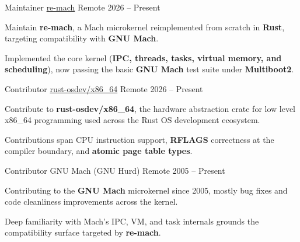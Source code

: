 
\begin{cventries}


	\cventry
	{Maintainer}
	{\href{https://github.com/llp42/re-mach}{re-mach}}
	{Remote}
	{2026 -- Present}
	{
		\begin{cvitems}
			\item Maintain \textbf{re-mach}, a Mach microkernel reimplemented from scratch in \textbf{Rust}, targeting compatibility with \textbf{GNU Mach}.
			\item Implemented the core kernel (\textbf{IPC, threads, tasks, virtual memory, and scheduling}), now passing the basic \textbf{GNU Mach} test suite under \textbf{Multiboot2}.
		\end{cvitems}
	}

	\cventry
	{Contributor}
	{\href{https://github.com/rust-osdev/x86_64}{rust-osdev/x86\_64}}
	{Remote}
	{2026 -- Present}
	{
		\begin{cvitems}
			\item Contribute to \textbf{rust-osdev/x86\_64}, the hardware abstraction crate for low level x86\_64 programming used across the Rust OS development ecosystem.
			\item Contributions span CPU instruction support, \textbf{RFLAGS} correctness at the compiler boundary, and \textbf{atomic page table types}.
		\end{cvitems}
	}

	\cventry
	{Contributor}
	{GNU Mach (GNU Hurd)}
	{Remote}
	{2005 -- Present}
	{
		\begin{cvitems}
			\item Contributing to the \textbf{GNU Mach} microkernel since 2005, mostly bug fixes and code cleanliness improvements across the kernel.
			\item Deep familiarity with Mach's IPC, VM, and task internals grounds the compatibility surface targeted by \textbf{re-mach}.
		\end{cvitems}
	}

\end{cventries}
